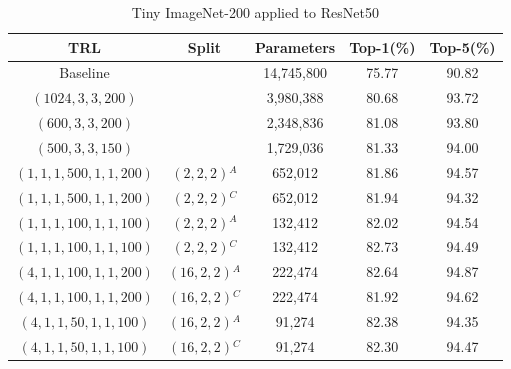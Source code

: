 \documentclass{article}
\begin{document}
\begin{table}
	\caption{Tiny ImageNet-200 applied to ResNet50}
	\label{atab-3}
	\centering
	\begin{tabular}{c c c c c}
		\toprule
		\textbf{TRL} & \textbf{Split} & \textbf{Parameters} & \textbf{Top-1(\%)} & \textbf{Top-5(\%)} \\
		\midrule
		Baseline & & 14,745,800 & 75.77 & 90.82 \\
		$(1024,3,3,200)$ & & 3,980,388 & 80.68 & 93.72 \\
		$(600,3,3,200)$ & & 2,348,836 & 81.08 & 93.80 \\
		$(500,3,3,150)$ & & 1,729,036 & 81.33 & 94.00 \\
		$(1,1,1,500,1,1,200)$ & $(2,2,2)$$^A$ & 652,012 & 81.86 & 94.57 \\
		$(1,1,1,500,1,1,200)$ & $(2,2,2)$$^C$ & 652,012 & 81.94 & 94.32 \\
		$(1,1,1,100,1,1,100)$ & $(2,2,2)$$^A$ & 132,412 & 82.02 & 94.54 \\
		$(1,1,1,100,1,1,100)$ & $(2,2,2)$$^C$ & 132,412 & 82.73 & 94.49 \\
		$(4,1,1,100,1,1,200)$ & $(16,2,2)$$^A$ & 222,474 & 82.64 & 94.87 \\
		$(4,1,1,100,1,1,200)$ & $(16,2,2)$$^C$ & 222,474 & 81.92 & 94.62 \\
		$(4,1,1,50,1,1,100)$ & $(16,2,2)$$^A$ & 91,274 & 82.38 & 94.35 \\
		$(4,1,1,50,1,1,100)$ & $(16,2,2)$$^C$ & 91,274 & 82.30 & 94.47 \\
		\hline
	\end{tabular}
\end{table}
\end{document}
